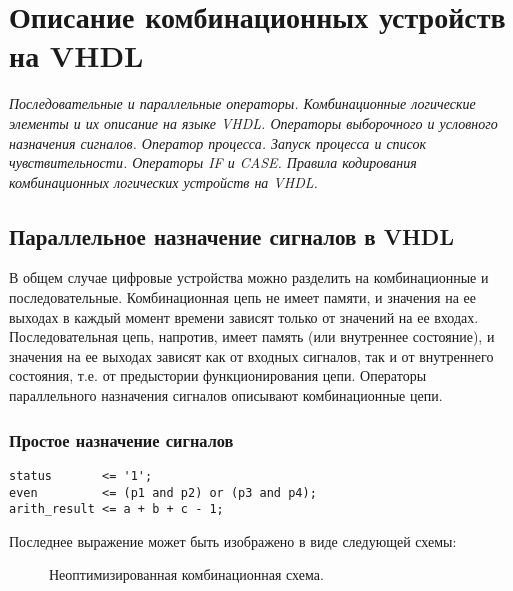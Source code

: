 \chapter{Описание комбинационных устройств на VHDL}

\emph{Последовательные и параллельные операторы. Комбинационные логические элементы и их описание на языке VHDL. Операторы выборочного и условного назначения сигналов. Оператор процесса. Запуск процесса и список чувствительности. Операторы IF и CASE. Правила кодирования комбинационных логических устройств на VHDL.}

\section{Параллельное назначение сигналов в VHDL}

В общем случае цифровые устройства можно разделить на комбинационные и последовательные. Комбинационная цепь не имеет памяти, и значения на ее выходах в каждый момент времени зависят только от значений на ее входах.  Последовательная цепь, напротив, имеет память (или внутреннее состояние), и значения на ее выходах зависят как от входных сигналов, так и от внутреннего состояния, т.е. от предыстории функционирования цепи. Операторы параллельного назначения сигналов описывают комбинационные цепи.

\subsection{Простое назначение сигналов}
\begin{Code}
\begin{lstlisting}
status       <= '1';
even         <= (p1 and p2) or (p3 and p4);
arith_result <= a + b + c - 1;
\end{lstlisting}
\end{Code}
Последнее выражение может быть изображено в виде следующей схемы:

\begin{figure}[ht]
\centering
{}
\caption{Неоптимизированная комбинационная схема.}
\label{comb_circuit_noopt}
\end{figure}

